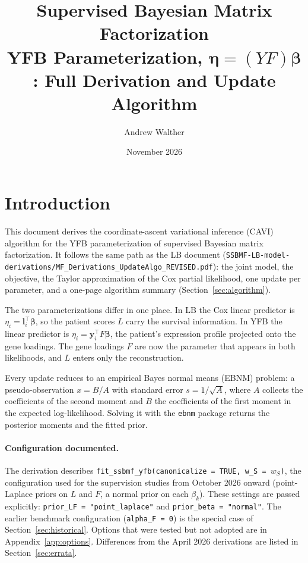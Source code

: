 \documentclass[11pt]{article}
\title{\textbf{Supervised Bayesian Matrix Factorization}\\
       \large YFB Parameterization, $\bm{\eta} = (YF)\bm{\beta}$:
       Full Derivation and Update Algorithm}
\author{Andrew Walther}
\date{November 2026}
\begin{document}
\maketitle
\tableofcontents
\newpage

\section{Introduction}

This document derives the coordinate-ascent variational inference (CAVI)
algorithm for the YFB parameterization of supervised Bayesian matrix
factorization. It follows the same path as the LB document
(\texttt{SSBMF-LB-model-derivations/MF\_Derivations\_UpdateAlgo\_REVISED.pdf}):
the joint model, the objective, the Taylor approximation of the Cox partial
likelihood, one update per parameter, and a one-page algorithm summary
(Section~\ref{sec:algorithm}).

The two parameterizations differ in one place. In LB the Cox linear predictor
is $\eta_i = \bm{l}_i^\top\bm{\beta}$, so the patient scores $L$ carry the
survival information. In YFB the linear predictor is
$\eta_i = \bm{y}_i^\top F\bm{\beta}$, the patient's expression profile projected
onto the gene loadings. The gene loadings $F$ are now the parameter that appears
in both likelihoods, and $L$ enters only the reconstruction.

Every update reduces to an empirical Bayes normal means (EBNM) problem: a
pseudo-observation $x = B/A$ with standard error $s = 1/\sqrt{A}$, where $A$
collects the coefficients of the second moment and $B$ the coefficients of the
first moment in the expected log-likelihood. Solving it with the \texttt{ebnm}
package returns the posterior moments and the fitted prior.

\paragraph{Configuration documented.} The derivation describes
\texttt{fit\_ssbmf\_yfb(canonicalize = TRUE, w\_S = $w_S$)}, the configuration
used for the supervision studies from October 2026 onward (point-Laplace priors
on $L$ and $F$, a normal prior on each $\beta_k$). These settings are passed
explicitly: \texttt{prior\_LF = "point\_laplace"} and
\texttt{prior\_beta = "normal"}. The earlier benchmark
configuration (\texttt{alpha\_F = 0}) is the special case of
Section~\ref{sec:historical}. Options that were tested but not adopted are in
Appendix~\ref{app:options}. Differences from the April 2026 derivations are
listed in Section~\ref{sec:errata}.
\end{document}
